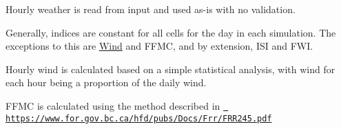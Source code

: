 Hourly weather is read from input and used as-\/is with no validation.

Generally, indices are constant for all cells for the day in each simulation. The exceptions to this are \mbox{\hyperlink{classtbd_1_1wx_1_1Wind}{Wind}} and F\+F\+MC, and by extension, I\+SI and F\+WI.

Hourly wind is calculated based on a simple statistical analysis, with wind for each hour being a proportion of the daily wind.

F\+F\+MC is calculated using the method described in \href{https://www.for.gov.bc.ca/hfd/pubs/Docs/Frr/FRR245.pdf}{\texttt{ https\+://www.\+for.\+gov.\+bc.\+ca/hfd/pubs/\+Docs/\+Frr/\+F\+R\+R245.\+pdf}} 